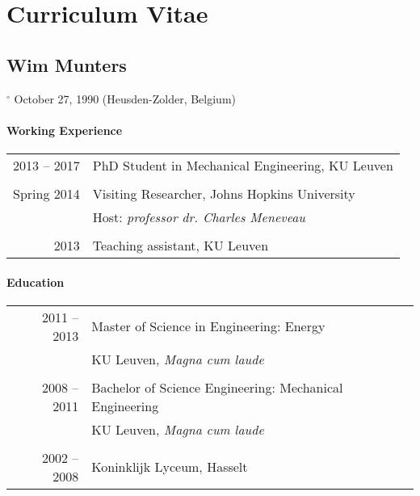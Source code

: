 \chapter{Curriculum Vitae}\label{ch:curriculum}

\section*{Wim Munters}
$^\circ$ October 27, 1990 (Heusden-Zolder, Belgium)

\subsubsection*{Working Experience}
\begin{tabular}{rl}
	2013 -- 2017 		& 		PhD Student in Mechanical Engineering, KU Leuven\\ 
	&\\
	Spring 2014		& 		Visiting Researcher, Johns Hopkins University\\
		&  		Host: \textit{professor dr. Charles Meneveau}\\
		&\\
	2013  		& 		Teaching assistant, KU Leuven\\ 
\end{tabular} 


\subsubsection*{Education}
\begin{tabular}{rl}
	2011 -- 2013 		& 		Master of Science in Engineering: Energy\\ 
	&  		KU Leuven, \textit{Magna cum laude}\\

	&\\	
	2008 -- 2011 		& 		Bachelor of Science Engineering: Mechanical Engineering\\ 
	&  		KU Leuven, \textit{Magna cum laude}\\
	&\\	
	2002 -- 2008 		& 		Koninklijk Lyceum, Hasselt\\ 
\end{tabular} 

\cleardoublepage

